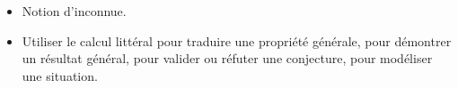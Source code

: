 \begin{prerequis}    
    \begin{itemize}        
        \item[\emoji{red-heart}] Notion d'inconnue.
        \columnbreak
        \item[\emoji{diamond-suit}] Utiliser le calcul littéral pour traduire une propriété générale, pour démontrer un résultat général, pour valider ou réfuter une conjecture, pour modéliser une situation.  
    \end{itemize}
\end{prerequis}